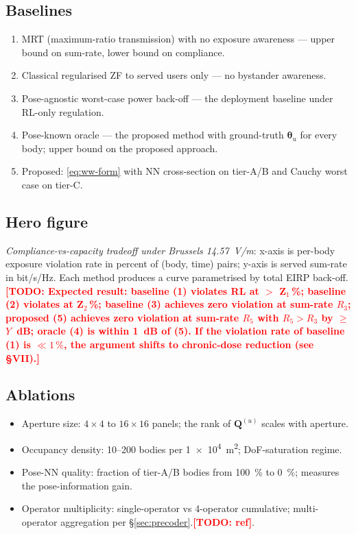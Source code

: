 \documentclass[journal,twoside,onecolumn]{IEEEtran}
\theoremstyle{definition}
\newcommand{\TODO}[1]{\textcolor{red}{\textbf{[TODO: #1]}}}
\newcommand{\Q}{\mathbf{Q}}
\begin{document}
\subsection{Baselines}

\begin{enumerate}
\item
MRT (maximum-ratio transmission) with no exposure awareness ---
upper bound on sum-rate, lower bound on compliance.
\item
Classical regularised ZF to served users only --- no bystander
awareness.
\item
Pose-agnostic worst-case power back-off --- the deployment
baseline under RL-only regulation.
\item
Pose-known oracle --- the proposed method with ground-truth
$\bm\theta_u$ for every body; upper bound on the proposed
approach.
\item
Proposed: \eqref{eq:ww-form} with NN cross-section on tier-A/B and
Cauchy worst case on tier-C.
\end{enumerate}

\subsection{Hero figure}

\emph{Compliance-vs-capacity tradeoff under Brussels
\SI{14.57}{V/m}}: x-axis is per-body exposure violation rate in
percent of (body, time) pairs; y-axis is served sum-rate in
bit/s/Hz. Each method produces a curve parametrised by total EIRP
back-off. \TODO{Expected result: baseline (1) violates RL at $>$
Z$_1$\,\%; baseline (2) violates at Z$_2$\,\%; baseline (3)
achieves zero violation at sum-rate $R_3$; proposed (5) achieves
zero violation at sum-rate $R_5$ with $R_5>R_3$ by $\ge$
$Y$~dB; oracle (4) is within \SI{1}{dB} of (5). If the
violation rate of baseline (1) is $\ll 1\,\%$, the argument shifts
to chronic-dose reduction (see §VII).}

\subsection{Ablations}

\begin{itemize}
\item
Aperture size: $4{\times}4$ to $16{\times}16$ panels; the rank of
$\Q^{(u)}$ scales with aperture.
\item
Occupancy density: \numrange{10}{200} bodies per \SI{1e4}{m^2};
DoF-saturation regime.
\item
Pose-NN quality: fraction of tier-A/B bodies from \SI{100}{\%} to
\SI{0}{\%}; measures the pose-information gain.
\item
Operator multiplicity: single-operator vs 4-operator cumulative;
multi-operator aggregation per
§\ref{sec:precoder}.\TODO{ref}.
\end{itemize}
\end{document}
